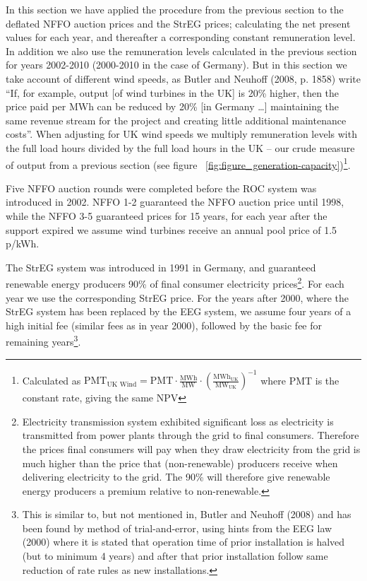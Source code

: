 \documentclass[a4paper, 12pt]{article}
\begin{document}
In this section we have applied the procedure from the previous section to the deflated NFFO auction prices and the StrEG prices; calculating the net present values for each year, and thereafter a corresponding constant remuneration level. In addition we also use the remuneration levels calculated in the previous section for years 2002-2010 (2000-2010 in the case of Germany). But in this section we take account of different wind speeds, as Butler and Neuhoff (2008, p. 1858) write ``If, for example, output [of wind turbines in the UK] is 20\% higher, then the price paid per MWh can be reduced by 20\% [in Germany …] maintaining the same revenue stream for the project and creating little additional maintenance costs''. When adjusting for UK wind speeds we multiply remuneration levels with the full load hours divided by the full load hours in the UK – our crude measure of output from a previous section (see figure ~\ref{fig:figure_generation-capacity})\footnote{Calculated as $\text{PMT}_\text{UK Wind} = \text{PMT} \cdot \frac{\text{MWh}}{\text{MW}} \cdot \left(\frac{\text{MWh}_\text{UK}}{\text{MW}_\text{UK}}\right)^{-1}$ where PMT is the constant rate, giving the same NPV}.

Five NFFO auction rounds were completed before the ROC system was introduced in 2002. NFFO 1-2 guaranteed the NFFO auction price until 1998, while the NFFO 3-5 guaranteed prices for 15 years, for each year after the support expired we assume wind turbines receive an annual pool price of 1.5 p/kWh. 

The StrEG system was introduced in 1991 in Germany, and guaranteed renewable energy producers 90\% of final consumer electricity prices\footnote{Electricity transmission system exhibited significant loss as electricity is transmitted from power plants through the grid to final consumers. Therefore the prices final consumers will pay when they draw electricity from the grid is much higher than the price that (non-renewable) producers receive when delivering electricity to the grid. The 90\% will therefore give renewable energy producers a premium relative to non-renewable.}. For each year we use the corresponding StrEG price. For the years after 2000, where the StrEG system has been replaced by the EEG system, we assume four years of a high initial fee (similar fees as in year 2000), followed by the basic fee for remaining years\footnote{This is similar to, but not mentioned in, Butler and Neuhoff (2008) and has been found by method of trial-and-error, using hints from the EEG law (2000) where it is stated that operation time of prior installation is halved (but to minimum 4 years) and after that prior installation follow same reduction of rate rules as new installations.}.
\end{document}
